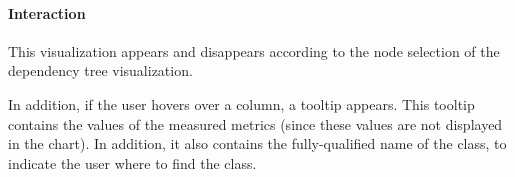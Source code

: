 \paragraph{Interaction}
This visualization appears and disappears according to the node selection of the dependency tree visualization.

In addition, if the user hovers over a column, a tooltip appears. This tooltip contains the values of the measured metrics (since these values are not displayed in the chart). In addition, it also contains the fully-qualified name of the class, to indicate the user where to find the class.
